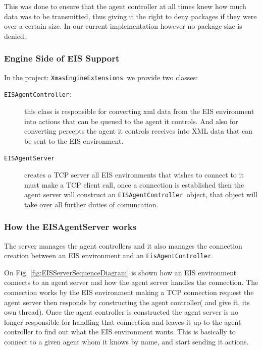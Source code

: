 This was done to ensure that the agent controller at all times knew
how much data was to be transmitted, thus giving it the right to deny
packages if they were over a certain size. In our current implementation
however no package size is denied. 


\subsubsection*{Engine Side of EIS Support}

In the project: \texttt{XmasEngineExtensions }we provide two classes:
\begin{description}
\item [{\texttt{EISAgentController:}}] this class is responsible for converting
xml data from the EIS environment into actions that can be queued
to the agent it controls. And also for converting percepts the agent
it controls receives into XML data that can be sent to the EIS environment.
\item [{\texttt{EISAgentServer}}] creates a TCP server all EIS environments
that wishes to connect to it must make a TCP client call, once a connection
is established then the agent server will construct an \texttt{EISAgentController
}object, that object will take over all further duties of comuncation.
\end{description}

\subsubsection*{How the EISAgentServer works}

The server manages the agent controllers and it also manages the connection
creation between an EIS environment and an \texttt{EisAgentController}.

On Fig. \ref{fig:EISServerSequenceDiagram} is shown how an EIS environment
connects to an agent server and how the agent server handles the connection.
The connection works by the EIS environment making a TCP connection
request the agent server then responds by constructing the agent controller(
and give it, its own thread). Once the agent controller is constructed
the agent server is no longer responsible for handling that connection
and leaves it up to the agent controller to find out what the EIS
environment wants. This is basically to connect to a given agent whom
it knows by name, and start sending it actions.

